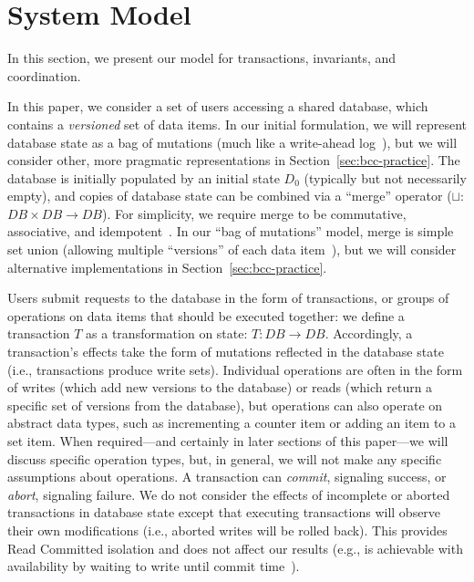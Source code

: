 
\section{System Model}
\label{sec:model}

In this section, we present our model for transactions, invariants,
and coordination.

 In this paper, we consider a set of users
accessing a shared database, which contains a \textit{versioned} set
of data items. In our initial formulation, we will represent database
state as a bag of mutations (much like a write-ahead
log~\cite{gray-book}), but we will consider other, more pragmatic
representations in Section~\ref{sec:bcc-practice}. The database is
initially populated by an initial state $D_0$ (typically but not
necessarily empty), and copies of database state can be combined via a
``merge'' operator ($\sqcup$: $DB \times DB \rightarrow DB$).  For
simplicity, we require merge to be commutative, associative, and
idempotent~\cite{calm,crdt}. In our ``bag of mutations'' model, merge
is simple set union (allowing multiple ``versions'' of each data
item~\cite{adya-phd}), but we will consider alternative
implementations in Section~\ref{sec:bcc-practice}.

 Users submit requests to the database in the
form of transactions, or groups of operations on data items that
should be executed together: we define a transaction $T$ as a
transformation on state: $T: DB \rightarrow DB$. Accordingly, a
transaction's effects take the form of mutations reflected in the
database state (i.e., transactions produce write sets). Individual
operations are often in the form of writes (which add new versions to
the database) or reads (which return a specific set of versions from
the database), but operations can also operate on abstract data types,
such as incrementing a counter item or adding an item to a set
item. When required---and certainly in later sections of this
paper---we will discuss specific operation types, but, in general, we
will not make any specific assumptions about operations. A transaction
can \textit{commit}, signaling success, or \textit{abort}, signaling
failure. We do not consider the effects of incomplete or aborted
transactions in database state except that executing transactions will
observe their own modifications (i.e., aborted writes will be rolled
back). This provides Read Committed isolation and does not affect our
results (e.g., is achievable with availability by waiting to write
until commit time~\cite{hat-vldb,spanner}).

